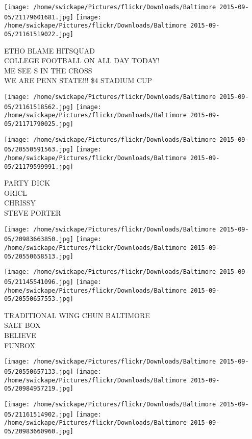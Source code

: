 \documentclass[10pt,letterpaper]{article}
\begin{document}
\texttt{[image: /home/swickape/Pictures/flickr/Downloads/Baltimore 2015-09-05/21179601681.jpg]}
\texttt{[image: /home/swickape/Pictures/flickr/Downloads/Baltimore 2015-09-05/21161519022.jpg]}

ETHO BLAME HITSQUAD\\
COLLEGE FOOTBALL ON ALL DAY TODAY!\\
ME SEE S IN THE CROSS\\
WE ARE PENN STATE!!! \$4 STADIUM CUP\\
\pagebreak

\texttt{[image: /home/swickape/Pictures/flickr/Downloads/Baltimore 2015-09-05/21161518562.jpg]}
\texttt{[image: /home/swickape/Pictures/flickr/Downloads/Baltimore 2015-09-05/21171790025.jpg]}

\texttt{[image: /home/swickape/Pictures/flickr/Downloads/Baltimore 2015-09-05/20550591563.jpg]}
\texttt{[image: /home/swickape/Pictures/flickr/Downloads/Baltimore 2015-09-05/21179599991.jpg]}

PARTY DICK\\
ORICL\\
CHRISSY\\
STEVE PORTER\\
\pagebreak

\texttt{[image: /home/swickape/Pictures/flickr/Downloads/Baltimore 2015-09-05/20983663850.jpg]}
\texttt{[image: /home/swickape/Pictures/flickr/Downloads/Baltimore 2015-09-05/20550658513.jpg]}

\texttt{[image: /home/swickape/Pictures/flickr/Downloads/Baltimore 2015-09-05/21145541096.jpg]}
\texttt{[image: /home/swickape/Pictures/flickr/Downloads/Baltimore 2015-09-05/20550657553.jpg]}

TRADITIONAL WING CHUN BALTIMORE\\
SALT BOX\\
BELIEVE\\
FUNBOX\\
\pagebreak

\texttt{[image: /home/swickape/Pictures/flickr/Downloads/Baltimore 2015-09-05/20550657133.jpg]}
\texttt{[image: /home/swickape/Pictures/flickr/Downloads/Baltimore 2015-09-05/20984957219.jpg]}

\texttt{[image: /home/swickape/Pictures/flickr/Downloads/Baltimore 2015-09-05/21161514902.jpg]}
\texttt{[image: /home/swickape/Pictures/flickr/Downloads/Baltimore 2015-09-05/20983660960.jpg]}
\end{document}
